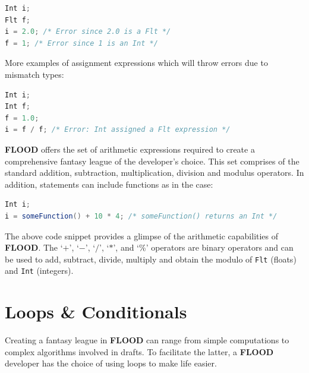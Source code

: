 \documentclass[12pt]{report}
\begin{document}
\begin{singlespace}
\begin{lstlisting}[language=Java,label=some-code,caption={Implicit type coersion is not supported.}]
Int i;
Flt f;
i = 2.0; /* Error since 2.0 is a Flt */
f = 1; /* Error since 1 is an Int */
\end{lstlisting}
\end{singlespace}

More examples of assignment expressions which will throw errors due to mismatch types:

\begin{singlespace}
\begin{lstlisting}[language=Java,label=some-code,caption=More errors due to mistmatch type declarations and assignments]
Int i;
Int f;
f = 1.0;
i = f / f; /* Error: Int assigned a Flt expression */
\end{lstlisting}
\end{singlespace}

\textbf{FLOOD} offers the set of arithmetic expressions required to create a comprehensive fantasy league of the developer's choice. This set comprises of the standard addition, subtraction, multiplication, division and modulus operators. In addition, statements can include functions as in the case:

\begin{singlespace}
\begin{lstlisting}[language=Java,label=some-code,caption={Function used in an arithmetic statement.}]
Int i;
i = someFunction() + 10 * 4; /* someFunction() returns an Int */
\end{lstlisting}
\end{singlespace}

The above code snippet provides a glimpse of the arithmetic capabilities of \textbf{FLOOD}. The `$+$', `$-$', `$/$', `$*$', and `\%' operators are binary operators and can be used to add, subtract, divide, multiply and obtain the modulo of \texttt{Flt} (floats) and \texttt{Int} (integers).

\section{Loops \& Conditionals}

Creating a fantasy league in \textbf{FLOOD} can range from simple computations to complex algorithms involved in drafts. To facilitate the latter, a \textbf{FLOOD} developer has the choice of using loops to make life easier.
\end{document}
